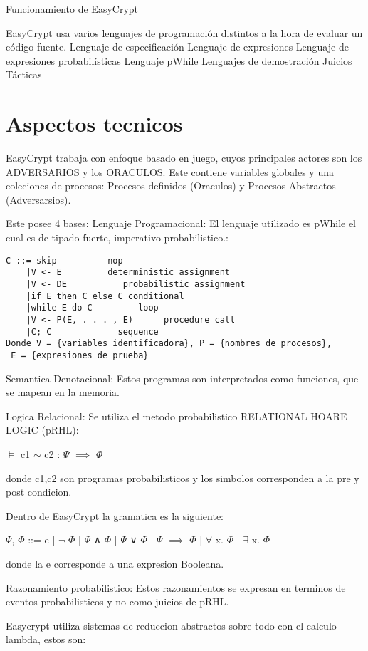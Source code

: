 \documentclass[runningheads,a4paper]{llncs}
\begin{document}
Funcionamiento de EasyCrypt 

EasyCrypt usa varios lenguajes de programación distintos a la hora de evaluar un código fuente. 
Lenguaje de especificación
Lenguaje de expresiones
Lenguaje de expresiones probabilísticas
Lenguaje pWhile
Lenguajes de demostración
Juicios
Tácticas


\section{Aspectos tecnicos}
EasyCrypt trabaja con enfoque basado en juego, cuyos principales actores son los ADVERSARIOS y los ORACULOS. Este contiene variables globales y una coleciones de procesos: Procesos definidos (Oraculos) y Procesos Abstractos (Adversarsios).

Este posee 4 bases:
Lenguaje Programacional:
El lenguaje utilizado es pWhile el cual es de tipado fuerte, imperativo probabilistico.:

\begin{Verbatim}
C ::= skip		 	nop
	|V <- E		    deterministic assignment
	|V <- DE		   probabilistic assignment
	|if E then C else C	conditional
	|while E do C	      loop
	|V <- P(E, . . . , E)      procedure call
	|C; C		      sequence
Donde V = {variables identificadora}, P = {nombres de procesos},
 E = {expresiones de prueba}
\end{Verbatim}

Semantica Denotacional:
Estos programas son interpretados como funciones, que se mapean en la memoria.

Logica Relacional: Se utiliza el metodo probabilistico RELATIONAL HOARE LOGIC (pRHL):
		
\centerline{$\models$ c1 $\sim$ c2 : $\Psi$ $\implies$ $\Phi$}	
			
donde c1,c2 son programas probabilisticos y los simbolos corresponden a la pre y post condicion.

Dentro de EasyCrypt la gramatica es la siguiente:

\centerline{$\Psi$, $\Phi$ ::= e $\mid$ $\neg$ $\Phi$ $\mid$ $\Psi$ ∧ $\Phi$ $\mid$ $\Psi$ ∨ $\Phi$ $\mid$ $\Psi$ $\implies$ $\Phi$ $\mid$ $\forall$ x. $\Phi$ $\mid$ $\exists$ x. $\Phi$}

donde la e corresponde a una expresion Booleana.


Razonamiento probabilistico:
Estos razonamientos se expresan en terminos de eventos probabilisticos y no como juicios de pRHL.\cite{article5}


Easycrypt utiliza sistemas de reduccion abstractos sobre todo con el calculo lambda, estos son:
\end{document}
